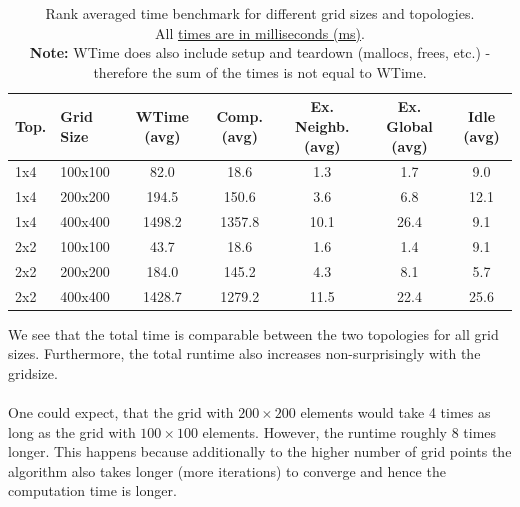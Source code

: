 \begin{table}[H]
    \centering
    \caption{Rank averaged time benchmark for different grid sizes and topologies.\\ All \underline{times are in milliseconds (ms)}.\\\textbf{Note:} WTime does also include setup and teardown (mallocs, frees, etc.) - therefore the sum of the times is not equal to WTime.}
    \label{tab:timing}
    \begin{tabular}{|l|l|S[table-format=4.1]|S[table-format=4.1]|S[table-format=2.1]|S[table-format=2.1]|S[table-format=2.1]|}
        \hline
        Top. & {{{Grid Size}}} & {{{WTime (avg)}}} & {{{Comp. (avg)}}} & {{{Ex. Neighb. (avg)}}} & {{{Ex. Global (avg)}}} & {{{Idle (avg)}}} \\\hline
        1x4 & 100x100 & 82.0 & 18.6 & 1.3 & 1.7 & 9.0 \\\hline
        1x4 & 200x200 & 194.5 & 150.6 & 3.6 & 6.8 & 12.1 \\\hline
        1x4 & 400x400 & 1498.2 & 1357.8 & 10.1 & 26.4 & 9.1 \\\hline
        2x2 & 100x100 & 43.7 & 18.6 & 1.6 & 1.4 & 9.1 \\\hline
        2x2 & 200x200 & 184.0 & 145.2 & 4.3 & 8.1 & 5.7 \\\hline
        2x2 & 400x400 & 1428.7 & 1279.2 & 11.5 & 22.4 & 25.6 \\\hline
    \end{tabular}
\end{table}
We see that the total time is comparable between the two topologies for all grid sizes. Furthermore, the total runtime also increases non-surprisingly with the gridsize. \\

\\
One could expect, that the grid with $200\times200$ elements would take 4 times as long as the grid with $100\times100$ elements. However, the runtime roughly 8 times longer. This happens because additionally to the higher number of grid points the algorithm also takes longer (more iterations) to converge and hence the computation time is longer. \\

